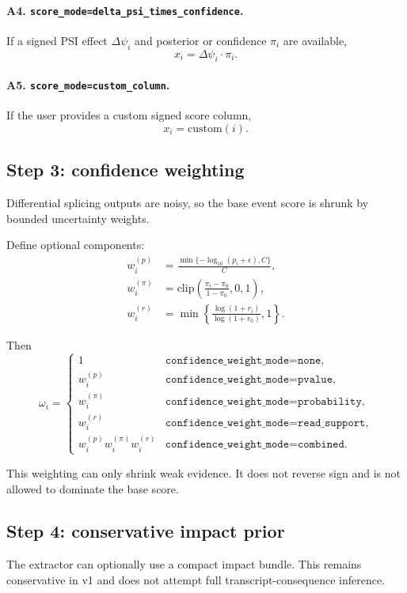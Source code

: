 \documentclass[11pt]{article}
\begin{document}
\paragraph{A4. \texttt{score\_mode=delta\_psi\_times\_confidence}.}
If a signed PSI effect $\Delta \psi_i$ and posterior or confidence $\pi_i$ are available,
\begin{equation}
x_i = \Delta \psi_i \cdot \pi_i.
\label{eq:dpsi_conf}
\end{equation}

\paragraph{A5. \texttt{score\_mode=custom\_column}.}
If the user provides a custom signed score column,
\[
x_i = \mathrm{custom}(i).
\]

\subsection{Step 3: confidence weighting}
Differential splicing outputs are noisy, so the base event score is shrunk by bounded uncertainty weights.

Define optional components:
\begin{align}
w_i^{(p)} &= \frac{\min\{-\log_{10}(p_i + \epsilon), C\}}{C}, \\
w_i^{(\pi)} &= \mathrm{clip}\!\left(\frac{\pi_i - \pi_0}{1-\pi_0}, 0, 1\right), \\
w_i^{(r)} &= \min\!\left\{\frac{\log(1+r_i)}{\log(1+r_0)}, 1\right\}.
\end{align}

Then
\[
\omega_i =
\begin{cases}
1 & \texttt{confidence\_weight\_mode=none},\\
w_i^{(p)} & \texttt{confidence\_weight\_mode=pvalue},\\
w_i^{(\pi)} & \texttt{confidence\_weight\_mode=probability},\\
w_i^{(r)} & \texttt{confidence\_weight\_mode=read\_support},\\
w_i^{(p)} w_i^{(\pi)} w_i^{(r)} & \texttt{confidence\_weight\_mode=combined}.
\end{cases}
\]

This weighting can only shrink weak evidence. It does not reverse sign and is not allowed to dominate the base score.

\subsection{Step 4: conservative impact prior}
The extractor can optionally use a compact impact bundle. This remains conservative in v1 and does not attempt full transcript-consequence inference.
\end{document}
